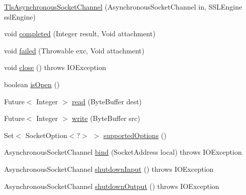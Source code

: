 \begin{DoxyCompactItemize}
\item 
\mbox{\hyperlink{classcom_1_1mysql_1_1cj_1_1protocol_1_1_tls_asynchronous_socket_channel_ad896e5429f1178d46c958d0aa078c3cb}{Tls\+Asynchronous\+Socket\+Channel}} (Asynchronous\+Socket\+Channel in, S\+S\+L\+Engine ssl\+Engine)
\item 
void \mbox{\hyperlink{classcom_1_1mysql_1_1cj_1_1protocol_1_1_tls_asynchronous_socket_channel_aa604aa99e8f1a19a3b41b1dffbee6b8f}{completed}} (Integer result, Void attachment)
\item 
void \mbox{\hyperlink{classcom_1_1mysql_1_1cj_1_1protocol_1_1_tls_asynchronous_socket_channel_a3bf4e0ebbf784acc346d0f1b021c200f}{failed}} (Throwable exc, Void attachment)
\item 
void \mbox{\hyperlink{classcom_1_1mysql_1_1cj_1_1protocol_1_1_tls_asynchronous_socket_channel_aabfaaefdbd511c6d9a50ca1ce463e25e}{close}} ()  throws I\+O\+Exception 
\item 
boolean \mbox{\hyperlink{classcom_1_1mysql_1_1cj_1_1protocol_1_1_tls_asynchronous_socket_channel_ac928f616d85f2bcdfc1d136b4a5c3a66}{is\+Open}} ()
\item 
Future$<$ Integer $>$ \mbox{\hyperlink{classcom_1_1mysql_1_1cj_1_1protocol_1_1_tls_asynchronous_socket_channel_a6b74d70823bd434de26eb434a1637b73}{read}} (Byte\+Buffer dest)
\item 
Future$<$ Integer $>$ \mbox{\hyperlink{classcom_1_1mysql_1_1cj_1_1protocol_1_1_tls_asynchronous_socket_channel_a993f4bc3833dc8db73f3163954faca33}{write}} (Byte\+Buffer src)
\item 
Set$<$ Socket\+Option$<$?$>$ $>$ \mbox{\hyperlink{classcom_1_1mysql_1_1cj_1_1protocol_1_1_tls_asynchronous_socket_channel_ad75f2eb33093dce08214761e80de872d}{supported\+Options}} ()
\item 
Asynchronous\+Socket\+Channel \mbox{\hyperlink{classcom_1_1mysql_1_1cj_1_1protocol_1_1_tls_asynchronous_socket_channel_a0ddea78378a185738bf38b2b44c01b2b}{bind}} (Socket\+Address local)  throws I\+O\+Exception 
\item 
Asynchronous\+Socket\+Channel \mbox{\hyperlink{classcom_1_1mysql_1_1cj_1_1protocol_1_1_tls_asynchronous_socket_channel_a92a7d0396c75539e42e89868e88626eb}{shutdown\+Input}} ()  throws I\+O\+Exception 
\item 
Asynchronous\+Socket\+Channel \mbox{\hyperlink{classcom_1_1mysql_1_1cj_1_1protocol_1_1_tls_asynchronous_socket_channel_aa101773740e726242024d8642c12cecf}{shutdown\+Output}} ()  throws I\+O\+Exception 

\end{DoxyCompactItemize}
